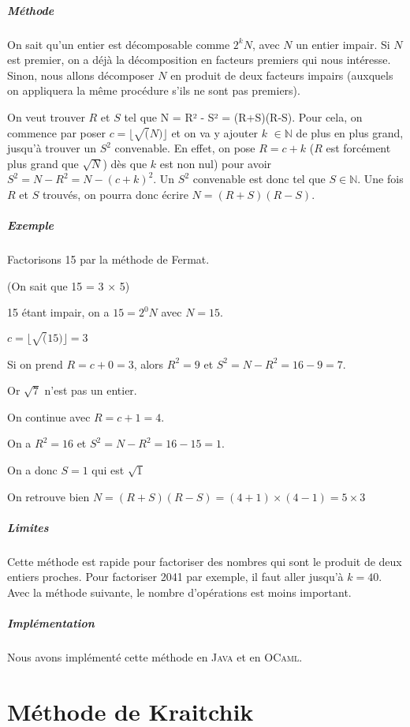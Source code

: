 \documentclass[11pt,a4paper]{article}
\begin{document}
	\subparagraph{Méthode}
	On sait qu'un entier est décomposable comme $2^{k}N$, avec $\mathit{N}$ un entier impair. Si $\mathit{N}$ est premier, on a déjà la décomposition en facteurs premiers qui nous intéresse. Sinon, nous allons décomposer $\mathit{N}$ en produit de deux facteurs impairs (auxquels on appliquera la même procédure s'ils ne sont pas premiers). 
	
	On veut trouver $\mathit{R}$ et $\mathit{S}$ tel que N = R² - S² = (R+S)(R-S). 
	Pour cela, on commence par poser $\mathit{c = \lfloor \sqrt(N)\rfloor}$ et on va y ajouter $\mathit{k}$ $\in\mathbb{N}$ de plus en plus grand, jusqu'à trouver un $\mathit{S^2}$ convenable. En effet, on pose $\mathit{R = c + k}$ ($\mathit{R}$ est forcément plus grand que  $\mathit{\sqrt{N}}$) dès que $k$ est non nul) pour avoir
	$\mathit{S^{2} = N - R^{2} = N - (c+k)^{2}}$.
	Un $\mathit{S^2}$ convenable est donc tel que $\mathit{S} \in \mathbb{N}$. Une fois $\mathit{R}$ et $\mathit{S}$ trouvés, on pourra donc écrire $\mathit{N = (R+S)(R-S)}$.
	
	\subparagraph{Exemple}
	Factorisons 15 par la méthode de Fermat. 
	
	(On sait que 15 = 3 $\times$  5)

	
	15 étant impair, on a $\mathit{15 = 2^{0}N}$ avec $\mathit{N = 15}$.
	
	$\mathit{c = \lfloor \sqrt(15)\rfloor = 3}$
	
	Si on prend $\mathit{R = c + 0 = 3}$, alors $\mathit{R^2 = 9}$ et $\mathit{S^2 = N - R^2 = 16 - 9 = 7}$. 
	
	Or $\sqrt{7}$ n'est pas un entier. 
	
	On continue avec $\mathit{R = c + 1 = 4}$. 
	
	On a $\mathit{R^2 = 16}$ et $\mathit{S^2 = N - R^2 = 16 - 15 = 1}$.
	
	On a donc $\mathit{S = 1}$ qui est $\sqrt 1$
	
	On retrouve bien $\mathit{N = (R+S)(R-S) = (4+1) \times (4-1) = 5 \times 3}$
	
	\subparagraph{Limites}
	Cette méthode est rapide pour factoriser des nombres qui sont le produit de deux entiers proches. Pour factoriser 2041 par exemple, il faut aller jusqu'à $k = 40$. Avec la méthode suivante, le nombre d'opérations est moins important.
	
	\subparagraph{Implémentation}
	Nous avons implémenté cette méthode en \textsc{Java} et en \textsc{OCaml}.
	
	\newpage
	
	\section{\LARGE{Méthode de Kraitchik}}
	
\end{document}
